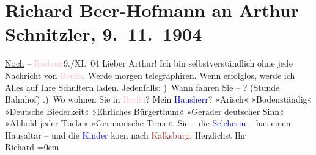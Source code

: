 

               \section[Richard Beer-Hofmann an Arthur Schnitzler, 9. 11. 1904]{ Richard Beer-Hofmann an Arthur Schnitzler,
               9. 11. 1904}\nopagebreak{}\rehead{ }\normalsize\beginnumbering{} \toendnotes[C]{\smallbreak\pagebreak[2]} 
\toendnotes[C]{\smallbreak}\pstart
           \centering{}\uline{Noch} – \textcolor{pink}{Rodaun}{}\ledrightnote{\textcolor{pink}{Rodaun}}{ }9./XI. 04\pend
           \pstart
           Lieber Arthur! Ich bin selbstverständlich ohne jede Nachricht von
                  \textcolor{pink}{Berlin}{}\ledrightnote{\textcolor{pink}{Berlin}}. Werde morgen telegraphiren. Wenn
               erfolglos, werde ich Alles auf Ihre Schultern laden. Jedenfalls:\pend
           ) Wann fahren Sie – \label{K_L01468_1v}\label{K_L01468_1h}? \introOben{}(Stunde Bahnhof)\introOben{}\pend
           .) Wo wohnen Sie in \textcolor{pink}{Berlin}{}\ledrightnote{\textcolor{pink}{Berlin}}?\pend
           \pstart
           Mein \textcolor{blue}{Hausherr}{}? »Arisch«
               »Bodenständig« »Deutsche Biederkeit« »Ehrliches Bürgerthum« »Gerader deutscher Sinn«
               »Abhold jeder Tücke« »Germanische Treue«. Sie – die \textcolor{blue}{Selcherin}{} – hat einen Hausaltar – und die \textcolor{blue}{Kinder}{} ko{\geminationm}en nach
                  \textcolor{brown}{Kalksburg}{}\ledrightnote{\textcolor{brown}{Kollegium Kalksburg}}.\pend
           \pstart
           Herzlichst Ihr{\\[\baselineskip]}\spacefill\mbox{Richard}\pend
           \leftskip=0em{}\endnumbering{}  
      